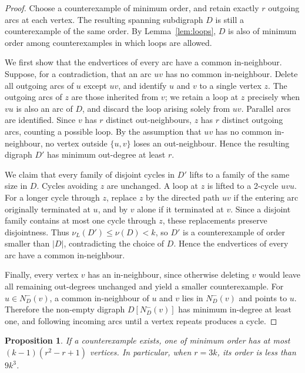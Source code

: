 \documentclass[10pt,a4paper]{article}
\newtheorem{proposition}[theorem]{Proposition}
\numberwithin{equation}{section}
\begin{document}
\begin{proof}
Choose a counterexample of minimum order, and retain exactly $r$
outgoing arcs at each vertex. The resulting spanning subdigraph $D$
is still a counterexample of the same order. By
Lemma~\ref{lem:loops}, $D$ is also of minimum order among
counterexamples in which loops are allowed.

We first show that the endvertices of every arc have a common
in-neighbour. Suppose, for a contradiction, that an arc $uv$ has no
common in-neighbour. Delete all outgoing arcs of $u$ except $uv$, and
identify $u$ and $v$ to a single vertex $z$. The outgoing arcs of $z$
are those inherited from $v$; we retain a loop at $z$ precisely when
$vu$ is also an arc of $D$, and discard the loop arising solely from $uv$.
Parallel arcs are identified. Since $v$ has $r$ distinct out-neighbours,
$z$ has $r$ distinct outgoing arcs, counting a possible loop. By the
assumption that $uv$ has no common in-neighbour, no vertex outside
$\{u,v\}$ loses an out-neighbour. Hence the resulting digraph $D'$ has
minimum out-degree at least $r$.

We claim that every family of disjoint cycles in $D'$ lifts to a
family of the same size in $D$. Cycles avoiding $z$ are unchanged. A
loop at $z$ is lifted to a 2-cycle $uvu$. For a longer cycle through
$z$, replace $z$ by the directed path $uv$ if the entering arc originally
terminated at $u$, and by $v$ alone if it terminated at $v$. Since a
disjoint family contains at most one cycle through $z$, these
replacements preserve disjointness. Thus $\nu_L(D')\le\nu(D)<k$,
so $D'$ is a counterexample of order smaller than $|D|$, contradicting
the choice of $D$. Hence the endvertices of every arc have a common
in-neighbour.

Finally, every vertex $v$ has an in-neighbour, since  otherwise deleting $v$
would leave all remaining out-degrees unchanged and yield a smaller
counterexample. For $u\in N_D^-(v)$, a common in-neighbour of  $u$ and $v$ lies in $N_D^-(v)$ and points to $u$. Therefore the
non-empty digraph $D[N_D^-(v)]$ has minimum in-degree at least one, and
following incoming arcs until a vertex repeats produces a cycle.
\end{proof}


\begin{proposition}\label{prop:order}
If a counterexample exists, one of minimum order has at most
$(k-1)(r^2-r+1)$ vertices. In particular, when $r=3k$, its order is
less than $9k^3$.
\end{proposition}
\end{document}
